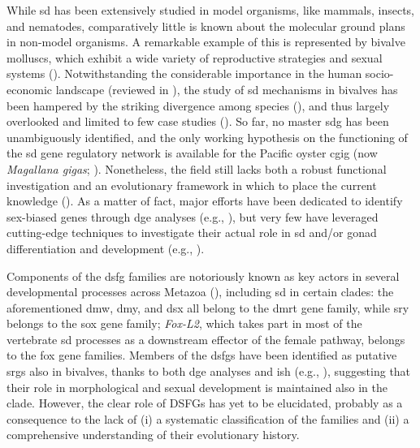 \documentclass[../main.tex]{subfiles}
\begin{document}
While \gls{sd} has been extensively studied in model organisms, like mammals, insects, and nematodes, comparatively little is known about the molecular ground plans in non-model organisms. A remarkable example of this is represented by bivalve molluscs, which exhibit a wide variety of reproductive strategies and sexual systems (\textbf{\cite{breton2018sex}}). Notwithstanding the considerable importance in the human socio-economic landscape (reviewed in \textbf{\cite{haszprunar2012molluscs, gomes2020molluscan}}), the study of \gls{sd} mechanisms in bivalves has been hampered by the striking divergence among species (\textbf{\cite{li2022sex}}), and thus largely overlooked and limited to few case studies (\textbf{\cite{breton2018sex, nicolini2023bivalves}}). So far, no master \gls{sdg} has been unambiguously identified, and the only working hypothesis on the functioning of the \gls{sd} gene regulatory network is available for the Pacific oyster \gls{cgig} (now \textit{Magallana gigas}; \textbf{\cite{zhang2014genomic}}). Nonetheless, the field still lacks both a robust functional investigation and an evolutionary framework in which to place the current knowledge (\textbf{\cite{nicolini2023bivalves}}). As a matter of fact, major efforts have been dedicated to identify sex-biased genes through \gls{dge} analyses (e.g., \textbf{\cite{milani2013nuclear, teaniniuraitemoana2014gonad, zhang2014genomic, capt2018deciphering, afonso2019gonad}}), but very few have leveraged cutting-edge techniques to investigate their actual role in \gls{sd} and/or gonad differentiation and development (e.g., \textbf{\cite{liang2019sox2, sun2022examination}}).

Components of the \gls{dsfg} families are notoriously known as key actors in several developmental processes across Metazoa (\textbf{\cite{benayoun2011forkhead, matson2012sex, sarkar2013sox, mawaribuchi2019independent}}), including \gls{sd} in certain clades: the aforementioned \gls{dmw}, \gls{dmy}, and \gls{dsx} all belong to the \gls{dmrt} gene family, while \gls{sry} belongs to the \gls{sox} gene family; \textit{Fox-L2}, which takes part in most of the vertebrate \gls{sd} processes as a downstream effector of the female pathway, belongs to the \gls{fox} gene families. Members of the \glspl{dsfg} have been identified as putative \glspl{srg} also in bivalves, thanks to both \gls{dge} analyses and \gls{ish} (e.g., \textbf{\cite{naimi2009molecular, li2018foxl2, liang2019sox2, yue2021variance}}), suggesting that their role in morphological and sexual development is maintained also in the clade. However, the clear role of DSFGs has yet to be elucidated, probably as a consequence to the lack of (i) a systematic classification of the families and (ii) a comprehensive understanding of their evolutionary history.
\end{document}
